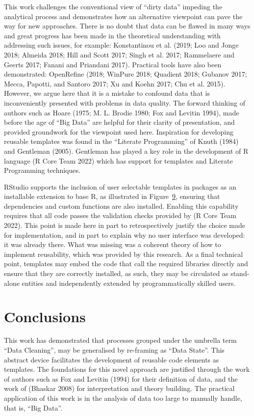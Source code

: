\documentclass[
]{article}
\begin{document}
This work challenges the conventional view of ``dirty data'' impeding
the analytical process and demonstrates how an alternative viewpoint can
pave the way for new approaches. There is no doubt that data can be
flawed in many ways and great progress has been made in the theoretical
understanding with addressing such issues, for example: Konstantinou et
al. (2019; Loo and Jonge 2018; Almeida 2018; Hill and Scott 2017; Singh
et al. 2017; Rammelaere and Geerts 2017; Fanani and Priandani 2017).
Practical tools have also been demonstrated: OpenRefine (2018; WinPure
2018; Quadient 2018; Gubanov 2017; Mecca, Papotti, and Santoro 2017; Xu
and Koehn 2017; Chu et al. 2015). However, we argue here that it is a
mistake to confound data that is inconveniently presented with problems
in data quality. The forward thinking of authors such as Hoare (1975; M.
L. Brodie 1980; Fox and Levitin 1994), made before the age of ``Big
Data'' are helpful for their clarity of presentation, and provided
groundwork for the viewpoint used here. Inspiration for developing
reusable templates was found in the ``Literate Programming'' of Knuth
(1984) and Gentleman (2005). Gentleman has played a key role in the
development of R language (R Core Team 2022) which has support for
templates and Literate Programming techniques.

RStudio supports the inclusion of user selectable templates in packages
as an installable extension to base R, as illustrated in
Figure~\protect\hyperlink{fig_RStudio_template_menu}{9}, ensuring that
dependencies and custom functions are also installed. Enabling this
capability requires that all code passes the validation checks provided
by (R Core Team 2022). This point is made here in part to
retrospectively justify the choice made for implementation, and in part
to explain why no user interface was developed: it was already there.
What was missing was a coherent theory of how to implement reusability,
which was provided by this research. As a final technical point,
templates may embed the code that call the required libraries directly
and ensure that they are correctly installed, as such, they may be
circulated as stand-alone entities and independently extended by
programmatically skilled users.

\hypertarget{conclusions}{%
\section{Conclusions}\label{conclusions}}

This work has demonstrated that processes grouped under the umbrella
term ``Data Cleaning'', may be generalised by re-framing as ``Data
State''. This abstract device facilitates the development of reusable
code elements as templates. The foundations for this novel approach are
justified through the work of authors such as Fox and Levitin (1994) for
their definition of data, and the work of (Bhaskar 2008) for
interpretation and theory building. The practical application of this
work is in the analysis of data too large to manually handle, that is,
``Big Data''.
\end{document}
